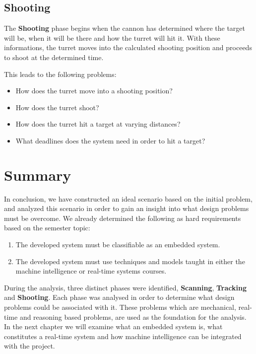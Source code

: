\subsection{Shooting}
The \textbf{Shooting} phase begins when the cannon has determined where the
target will be, when it will be there and how the turret will hit it. With
these informations, the turret moves into the calculated shooting position and
proceeds to shoot at the determined time.\nl

This leads to the following problems:
\begin{itemize}
  \item How does the turret move into a shooting position?
  \item How does the turret shoot?
  \item How does the turret hit a target at varying distances?
  \item What deadlines does the system need in order to hit a target?
\end{itemize}

\section{Summary}
In conclusion, we have constructed an ideal scenario based on the initial
problem, and analyzed this scenario in order to gain an insight into what
design problems must be overcome. We already determined the following as hard
requirements based on the semester topic:

\begin{enumerate}
	\item The developed system must be classifiable as an embedded system.
	\item The developed system must use techniques and models taught in either the
	machine intelligence or real-time systems courses.
\end{enumerate}

During the analysis, three distinct phases were identified, \textbf{Scanning},
\textbf{Tracking} and \textbf{Shooting}. Each phase was analysed in order to
determine what design problems could be associated with it. These problems
which are mechanical, real-time and reasoning based problems, are used as the
foundation for the analysis. In the next chapter we will examine what an
embedded system is, what constitutes a real-time system and how machine
intelligence can be integrated with the project.
